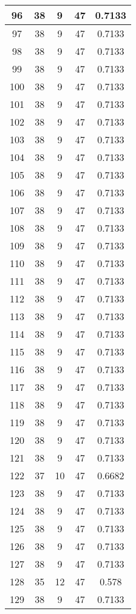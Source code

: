 \documentclass[letterpaper, 12pt]{article}
\begin{document}
\begin{longtable}{|c|c|c|c|c|}
\hline
96 & 38 & 9 & 47 & 0.7133 \\
\hline
97 & 38 & 9 & 47 & 0.7133 \\
\hline
98 & 38 & 9 & 47 & 0.7133 \\
\hline
99 & 38 & 9 & 47 & 0.7133 \\
\hline
100 & 38 & 9 & 47 & 0.7133 \\
\hline
101 & 38 & 9 & 47 & 0.7133 \\
\hline
102 & 38 & 9 & 47 & 0.7133 \\
\hline
103 & 38 & 9 & 47 & 0.7133 \\
\hline
104 & 38 & 9 & 47 & 0.7133 \\
\hline
105 & 38 & 9 & 47 & 0.7133 \\
\hline
106 & 38 & 9 & 47 & 0.7133 \\
\hline
107 & 38 & 9 & 47 & 0.7133 \\
\hline
108 & 38 & 9 & 47 & 0.7133 \\
\hline
109 & 38 & 9 & 47 & 0.7133 \\
\hline
110 & 38 & 9 & 47 & 0.7133 \\
\hline
111 & 38 & 9 & 47 & 0.7133 \\
\hline
112 & 38 & 9 & 47 & 0.7133 \\
\hline
113 & 38 & 9 & 47 & 0.7133 \\
\hline
114 & 38 & 9 & 47 & 0.7133 \\
\hline
115 & 38 & 9 & 47 & 0.7133 \\
\hline
116 & 38 & 9 & 47 & 0.7133 \\
\hline
117 & 38 & 9 & 47 & 0.7133 \\
\hline
118 & 38 & 9 & 47 & 0.7133 \\
\hline
119 & 38 & 9 & 47 & 0.7133 \\
\hline
120 & 38 & 9 & 47 & 0.7133 \\
\hline
121 & 38 & 9 & 47 & 0.7133 \\
\hline
122 & 37 & 10 & 47 & 0.6682 \\
\hline
123 & 38 & 9 & 47 & 0.7133 \\
\hline
124 & 38 & 9 & 47 & 0.7133 \\
\hline
125 & 38 & 9 & 47 & 0.7133 \\
\hline
126 & 38 & 9 & 47 & 0.7133 \\
\hline
127 & 38 & 9 & 47 & 0.7133 \\
\hline
128 & 35 & 12 & 47 & 0.578 \\
\hline
129 & 38 & 9 & 47 & 0.7133 \\

\end{longtable}
\end{document}
